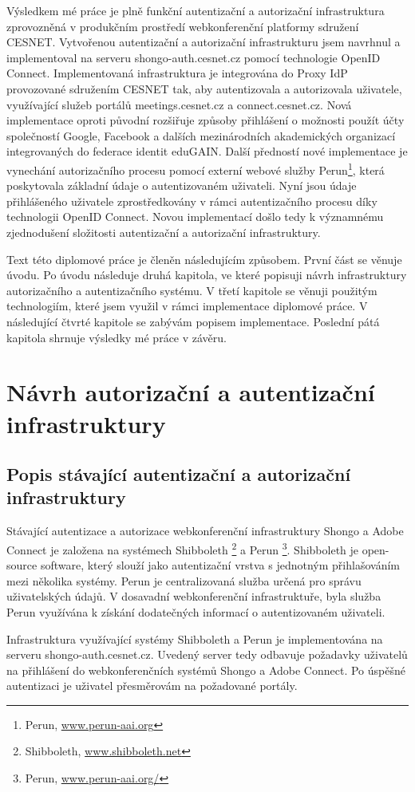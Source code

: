 \documentclass[
  printed, %
  twoside, %
  table,   %
  nolof,     %
  nolot,     %
]{fithesis3}
\begin{document}
Výsledkem mé práce je plně funkční autentizační a autorizační infrastruktura zprovozněná v produkčním prostředí webkonferenční platformy sdružení CESNET. Vytvořenou autentizační a autorizační infrastrukturu jsem navrhnul a implementoval na serveru shongo-auth.cesnet.cz pomocí technologie OpenID Connect. Implementovaná infrastruktura je integrována do Proxy IdP provozované sdružením CESNET tak, aby autentizovala a autorizovala uživatele, využívající služeb portálů meetings.cesnet.cz a connect.cesnet.cz. Nová implementace oproti původní rozšiřuje způsoby přihlášení o možnosti použít účty společností Google, Facebook a dalších mezinárodních akademických organizací integrovaných do federace identit eduGAIN. Další předností nové implementace je vynechání autorizačního procesu pomocí externí webové služby Perun\footnote{Perun, \url{www.perun-aai.org}}, která poskytovala základní údaje o autentizovaném uživateli. Nyní jsou údaje přihlášeného uživatele zprostředkovány v rámci autentizačního procesu díky technologii OpenID Connect. Novou implementací došlo tedy k významnému zjednodušení složitosti autentizační a autorizační infrastruktury. \par
Text této diplomové práce je členěn následujícím způsobem. První část se věnuje úvodu. Po úvodu následuje druhá kapitola, ve které popisuji návrh infrastruktury autorizačního a autentizačního systému. V třetí kapitole se věnuji použitým technologiím, které jsem využil v rámci implementace diplomové práce. V následující čtvrté kapitole se zabývám popisem implementace. Poslední pátá kapitola shrnuje výsledky mé práce v závěru.  

\chapter{Návrh autorizační a autentizační infrastruktury}
\section{Popis stávající autentizační a autorizační infrastruktury}
Stávající autentizace a autorizace webkonferenční infrastruktury Shongo a Adobe Connect je založena na systémech Shibboleth \footnote{Shibboleth, \url{www.shibboleth.net}} a Perun \footnote{Perun, \url{www.perun-aai.org/}}. Shibboleth je open-source software, který slouží jako autentizační vrstva s jednotným přihlašováním mezi několika systémy. Perun je centralizovaná služba určená pro správu uživatelských údajů. V dosavadní webkonferenční infrastruktuře, byla služba Perun využívána k získání dodatečných informací o autentizovaném uživateli. \par
Infrastruktura využívající systémy Shibboleth a Perun je implementována na serveru shongo-auth.cesnet.cz. Uvedený server tedy odbavuje požadavky uživatelů na přihlášení do webkonferenčních systémů Shongo a Adobe Connect. Po úspěšné autentizaci je uživatel přesměrovám na požadované portály. 
\end{document}
